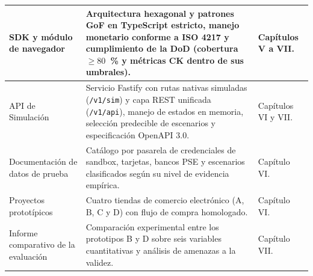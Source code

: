 {\begin{xltabular}{\textwidth}{|>{\raggedright\arraybackslash}p{3.0cm}|>{\raggedright\arraybackslash}X|>{\raggedright\arraybackslash}p{3.2cm}|}
SDK y módulo de navegador &
  Arquitectura hexagonal y patrones GoF en TypeScript estricto, manejo monetario conforme a ISO 4217 y cumplimiento de la DoD (cobertura $\ge 80$~\% y métricas CK dentro de sus umbrales). &
  Capítulos V a VII. \\ \hline
API de Simulación &
  Servicio Fastify con rutas nativas simuladas (\texttt{/v1/sim}) y capa REST unificada (\texttt{/v1/api}), manejo de estados en memoria, selección predecible de escenarios y especificación OpenAPI 3.0. &
  Capítulos VI y VII. \\ \hline
Documentación de datos de prueba &
  Catálogo por pasarela de credenciales de sandbox, tarjetas, bancos PSE y escenarios clasificados según su nivel de evidencia empírica. &
  Capítulo VI. \\ \hline
Proyectos prototípicos &
  Cuatro tiendas de comercio electrónico (A, B, C y D) con flujo de compra homologado. &
  Capítulo VI. \\ \hline
Informe comparativo de la evaluación &
  Comparación experimental entre los prototipos B y D sobre seis variables cuantitativas y análisis de amenazas a la validez. &
  Capítulo VII. \\ \hline
\end{xltabular}
}
